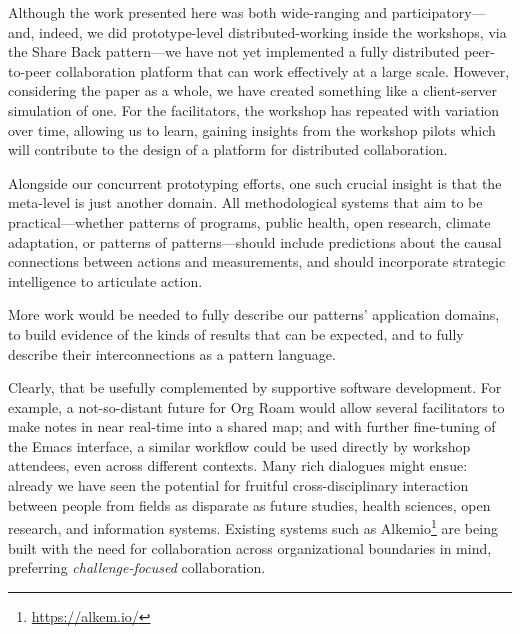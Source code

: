 \documentclass[acmlarge,timestamp]{acmart}
\begin{document}
Although the work presented here was both wide-ranging and
participatory—and, indeed, we did prototype-level distributed-working
inside the workshops, via the {\sc Share Back} pattern—we have not yet
implemented a fully distributed peer-to-peer collaboration platform
that can work effectively at a large scale.  However, considering the
paper as a whole, we have created something like a client-server
simulation of one.  For the facilitators, the workshop has repeated
with variation over time, allowing us to learn, gaining insights from
the workshop pilots which will contribute to the design of a platform
for distributed collaboration.

Alongside our concurrent prototyping efforts, one such crucial insight
is that the meta-level is just another domain.  All methodological
systems that aim to be practical—whether patterns of programs,
public health, open research, climate adaptation, or patterns of
patterns—should include predictions about the causal
connections between actions and measurements, and should incorporate
strategic intelligence to articulate action.

More work would be needed to fully describe our patterns’ application
domains, to build evidence of the kinds of results that can be
expected, and to fully describe their interconnections as a pattern
language.

Clearly, that be usefully complemented by supportive software
development.  For example, a not-so-distant future for Org Roam would
allow several facilitators to make notes in near real-time into a
shared map; and with further fine-tuning of the Emacs interface, a
similar workflow could be used directly by workshop attendees, even
across different contexts.  Many rich dialogues might ensue: already
we have seen the potential for fruitful cross-disciplinary interaction
between people from fields as disparate as future studies, health
sciences, open research, and information systems.  Existing systems
such as Alkemio\footnote{\url{https://alkem.io/}} are being built with
the need for collaboration across organizational boundaries in mind,
preferring \emph{challenge-focused} collaboration.
\end{document}
